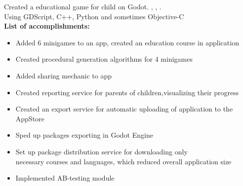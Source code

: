 

\vspace{2mm}
Created a educational game for child on Godot.
\href{https://apps.apple.com/app/id1473965253}{\color{blue}{AppStore}}, 
\href{https://play.google.com/store/apps/details?id=ltd.funexpected.math&hl=en&gl=US}{\color{blue}{GooglePlay}}, 
\href{https://funexpectedapps.com/}{\color{blue}{company site}}.\\
\vspace{2mm}
Using GDScript, C++, Python and sometimes Objective-C\\
\vspace{2mm}
{\color{accent}\normalsize\textbf{List of accomplishments:}}\par
\begin{itemize}
    \item Added 6 minigames to an app, created an education course in application
    \item Created procedural generation algorithms for 4 minigames
    \item Added sharing mechanic to app
    \item Created reporting service for parents of children,visualizing their progress
    \item Created an export service for automatic uploading of application to the AppStore
    \item Sped up packages exporting in Godot Engine
    \item Set up package distribution service for downloading only \\
    necessary courses and languages, which reduced overall application size
    \item Implemented AB-testing module 
\end{itemize}
